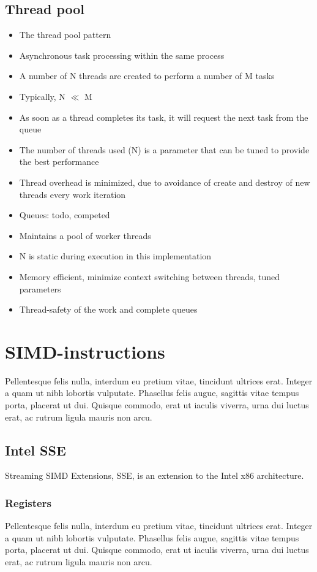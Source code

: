 \subsection{Thread pool}
\begin{itemize}
\item The thread pool pattern
\item Asynchronous task processing within the same process
\item A number of N threads are created to perform a number of M tasks
\item Typically, N $\ll$ M
\item As soon as a thread completes its task, it will request the next task from the queue
\item The number of threads used (N) is a parameter that can be tuned to provide the best performance
\item Thread overhead is minimized, due to avoidance of create and destroy of new threads every work iteration
\item Queues: todo, competed
\item Maintains a pool of worker threads
\item N is static during execution in this implementation
\item Memory efficient, minimize context switching between threads, tuned parameters
\item Thread-safety of the work and complete queues
\end{itemize}
\section{SIMD-instructions}
Pellentesque felis nulla, interdum eu pretium vitae, tincidunt ultrices erat. Integer a quam ut nibh lobortis vulputate. Phasellus felis augue, sagittis vitae tempus porta, placerat ut dui. Quisque commodo, erat ut iaculis viverra, urna dui luctus erat, ac rutrum ligula mauris non arcu.
\subsection{Intel SSE}
Streaming SIMD Extensions, SSE, is an extension to the Intel x86 architecture.
\subsubsection{Registers}
Pellentesque felis nulla, interdum eu pretium vitae, tincidunt ultrices erat. Integer a quam ut nibh lobortis vulputate. Phasellus felis augue, sagittis vitae tempus porta, placerat ut dui. Quisque commodo, erat ut iaculis viverra, urna dui luctus erat, ac rutrum ligula mauris non arcu.
